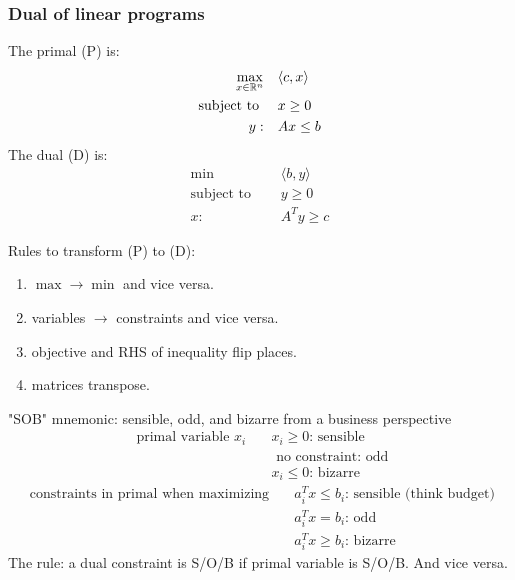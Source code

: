 \documentclass[class=article,crop=false]{standalone}
\begin{document}
\subsubsection{Dual of linear programs}
The primal (P) is:
\begin{align*}
\max_{x \in \mathbb{R}^{n}}\quad & \langle c,x \rangle \\
\text{subject to } \quad &x \geq 0\\
y:\quad  &Ax \leq b
\end{align*}
The dual (D) is:
\begin{align*}
\min\quad &\langle b,y \rangle \\
\text{subject to } \quad & y\geq 0\\
x:\quad & A^{T} y \geq c
\end{align*}

Rules to transform (P) to (D):
\begin{enumerate}[label=(\arabic*)]
	\item $ \max \to \min$ and vice versa.
	\item variables $ \to$ constraints and vice versa.
	\item objective and RHS of inequality flip places.
	\item matrices transpose.
\end{enumerate}
"SOB" mnemonic: sensible, odd, and bizarre from a business perspective
\begin{align*}
\text{ primal variable } x_i \quad &x_i\geq 0 \text{: sensible}  \\
& \text{ no constraint: odd}   \\
&x_i \leq 0 \text{: bizarre} 
\end{align*}
\begin{align*}
	\text{ constraints in primal when maximizing} \quad & a_i^{T}x\leq b_i \text{: sensible (think budget)}  \\
& a_i^{T}x=b_i\text{: odd}   \\
&a_i^{T}x \geq b_i \text{: bizarre} 
\end{align*}
The rule: a dual constraint is S/O/B if primal variable is S/O/B. And vice versa. 
\end{document}
